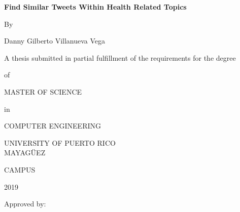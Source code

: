 \documentclass[12pt]{report}
\begin{document}
\newtheorem{definition}{Example}

%

\begin{titlepage}
    \centering 
    {\LARGE \textbf {Find Similar Tweets Within Health Related Topics}\par}
    \vspace{1cm}
    {By\par}
    {Danny Gilberto Villanueva Vega\par}    
    {A thesis submitted in partial fulfillment of the requirements for the degree \par}
    \vspace{.1cm}
    {of\par}
    \vspace{.1cm}
    {MASTER OF SCIENCE\par}
    {in\par}
    {COMPUTER ENGINEERING\par}
    {UNIVERSITY OF PUERTO RICO
    \\MAYAG\"UEZ}{  CAMPUS\par}
    {2019}
    \vspace{.1cm}
    \begin{flushleft}
      Approved by:\\
      \vspace{1cm}
    \end{flushleft}
    \begin{tabular}{l c c c c c r}
     

\end{tabular}
\end{titlepage}
\end{document}
